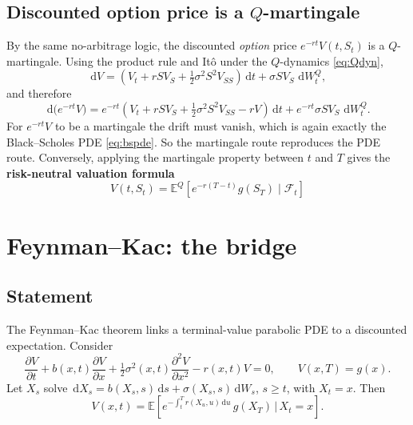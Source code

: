 \documentclass[11pt]{article}
\newcommand{\E}{\mathbb{E}}
\newcommand{\dd}{\,\mathrm{d}}
\begin{document}
\subsection{Discounted option price is a $Q$-martingale}
By the same no-arbitrage logic, the discounted \emph{option} price $e^{-rt}V(t,S_t)$ is a
$Q$-martingale. Using the product rule and It\^o under the $Q$-dynamics \eqref{eq:Qdyn},
\begin{equation}
\dd V = \left(V_t + rS V_S + \tfrac12\sigma^2 S^2 V_{SS}\right)\dd t + \sigma S V_S\,\dd W_t^Q,
\end{equation}
and therefore
\begin{equation}
\dd\bigl(e^{-rt}V\bigr)
= e^{-rt}\left(V_t + rSV_S + \tfrac12\sigma^2 S^2 V_{SS} - rV\right)\dd t
+ e^{-rt}\sigma S V_S\,\dd W_t^Q.
\end{equation}
For $e^{-rt}V$ to be a martingale the drift must vanish, which is again exactly the Black--Scholes PDE
\eqref{eq:bspde}. So the martingale route reproduces the PDE route. Conversely, applying the
martingale property between $t$ and $T$ gives the \textbf{risk-neutral valuation formula}
\begin{equation}\label{eq:rnv}
\boxed{\;V(t,S_t) = \E^{Q}\!\left[e^{-r(T-t)} g(S_T)\mid \mathcal F_t\right]\;}
\end{equation}

\section{Feynman--Kac: the bridge}

\subsection{Statement}
The Feynman--Kac theorem links a terminal-value parabolic PDE to a discounted expectation. Consider
\begin{equation}\label{eq:fkpde}
\frac{\partial V}{\partial t} + b(x,t)\frac{\partial V}{\partial x}
+ \tfrac12\sigma^2(x,t)\frac{\partial^2 V}{\partial x^2} - r(x,t)V = 0,
\qquad V(x,T) = g(x).
\end{equation}
Let $X_s$ solve $\dd X_s = b(X_s,s)\dd s + \sigma(X_s,s)\dd W_s$, $s\ge t$, with $X_t = x$. Then
\begin{equation}\label{eq:fk}
V(x,t) = \E\!\left[e^{-\int_t^T r(X_u,u)\dd u}\,g(X_T)\,\Big|\, X_t = x\right].
\end{equation}
\end{document}
